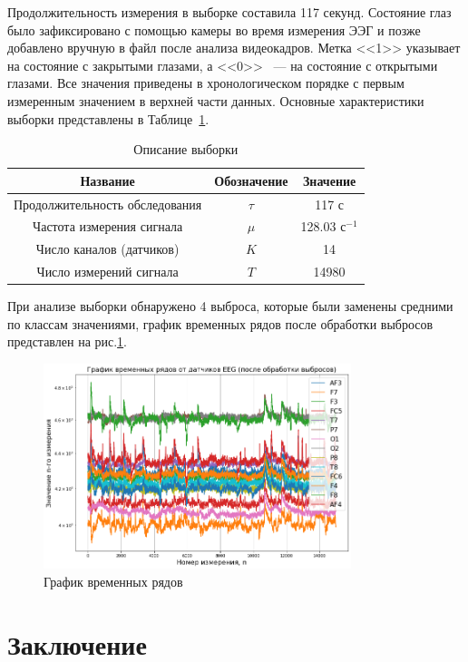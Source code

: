 \documentclass[a4paper, 12pt]{extarticle}
\begin{document}
Продолжительность измерения в выборке составила 117 секунд. 
Состояние глаз было зафиксировано с помощью камеры во время измерения ЭЭГ и позже добавлено 
вручную в файл после анализа видеокадров. Метка <<1>> указывает на состояние с закрытыми глазами, а 
<<0>> ~--- на состояние с открытыми глазами. Все значения приведены в хронологическом порядке с 
первым измеренным значением в верхней части данных.
Основные характеристики выборки представлены в
Таблице~\ref{table:sample}.

\begin{table}
	\centering
	\caption{Описание выборки}
	\begin{tabular}{|c|c|c|}
		\hline
		Название                       & Обозначение & Значение             \\
		\hline \hline
		Продолжительность обследования & $\tau$         & 117 с                \\ \hline
		Частота измерения сигнала      & $\mu$       & 128.03 $\text{с}^{-1}$   \\ \hline
	    Число каналов (датчиков)    & $K$   & 14          \\ \hline
		Число измерений сигнала             & $T$  & 14980           \\ \hline
	\end{tabular}
	\label{table:sample}
\end{table}
При анализе выборки обнаружено 4 выброса, которые были заменены средними по классам 
значениями, график временных рядов после обработки выбросов представлен на рис.\ref{fig:2}.

\begin{figure}[h]
	\centering
	\includegraphics[width=0.8\textwidth]{Dataset.png}
	\caption{График временных рядов}
	\label{fig:2}
\end{figure}



\section{Заключение}


\newpage



\end{document}
